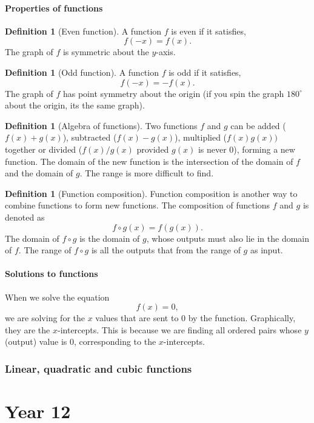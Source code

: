 \documentclass[12pt]{book}
\theoremstyle{definition}
\newtheorem{defi}[theo]{Definition}
\begin{document}
\subsection{Properties of functions}
  \begin{defi}[Even function]
    A function $f$ is even if it satisfies, \[f(-x)=f(x).\] The graph of $f$ is symmetric about
    the $y$-axis.
  \end{defi}
  \begin{defi}[Odd function]
    A function $f$ is odd if it satisfies, \[f(-x)=-f(x).\] The graph of $f$ has point symmetry about the origin (if you
    spin the graph $180^\circ$ about the origin, its the same graph).
  \end{defi}
  \begin{defi}[Algebra of functions]
    Two functions $f$ and $g$ can be added ($f(x)+g(x)$), subtracted ($f(x)-g(x)$), multiplied ($f(x)g(x))$ together or 
    divided ($f(x)/g(x)$ provided $g(x)$ is never $0$), forming a new function. The domain of the new function is the intersection of the domain of $f$
    and the domain of $g$. The range is more difficult to find.
  \end{defi}
  \begin{defi}[Function composition]
    Function composition is another way to combine functions to form new functions. The composition of functions $f$ and $g$
    is denoted as \[f\circ g(x)=f(g(x)).\] The domain of $f\circ g$ is the domain of $g$, whose outputs must also lie in the
    domain of $f$. The range of $f\circ g$ is all the outputs that from the range of $g$ as input.
  \end{defi}
\subsection{Solutions to functions}
  When we solve the equation \[f(x)=0,\] we are solving for the $x$ values that are sent to $0$ by the function. Graphically,
  they are the $x$-intercepts. This is because we are finding all ordered pairs whose $y$ (output) value is $0$, corresponding
  to the $x$-intercepts.
\section{Linear, quadratic and cubic functions}
\part{Year 12}
\end{document}
